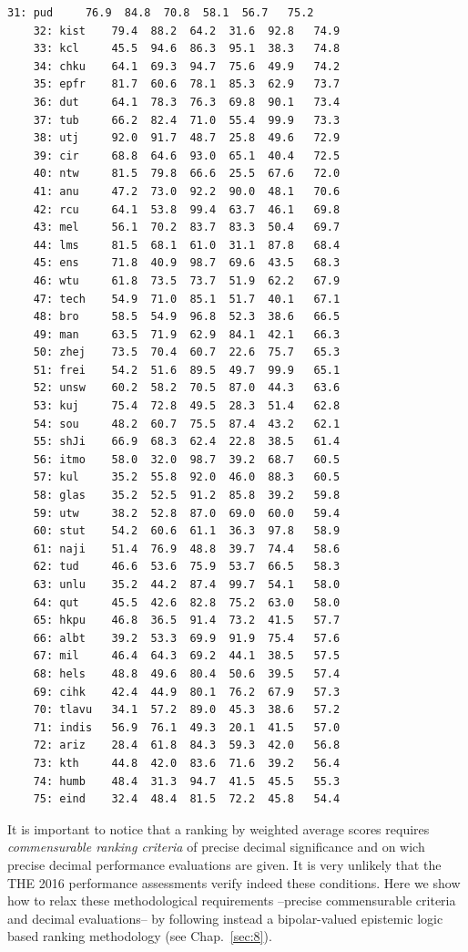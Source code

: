 \begin{lstlisting}[caption={Printing the ranked performance table},label=list:13.5,basicstyle=\ttfamily\scriptsize]
    31: pud 	76.9  84.8  70.8  58.1  56.7   75.2
    32: kist 	79.4  88.2  64.2  31.6  92.8   74.9
    33: kcl 	45.5  94.6  86.3  95.1  38.3   74.8
    34: chku 	64.1  69.3  94.7  75.6  49.9   74.2
    35: epfr 	81.7  60.6  78.1  85.3  62.9   73.7
    36: dut 	64.1  78.3  76.3  69.8  90.1   73.4
    37: tub 	66.2  82.4  71.0  55.4  99.9   73.3
    38: utj 	92.0  91.7  48.7  25.8  49.6   72.9
    39: cir 	68.8  64.6  93.0  65.1  40.4   72.5
    40: ntw 	81.5  79.8  66.6  25.5  67.6   72.0
    41: anu 	47.2  73.0  92.2  90.0  48.1   70.6
    42: rcu 	64.1  53.8  99.4  63.7  46.1   69.8
    43: mel 	56.1  70.2  83.7  83.3  50.4   69.7
    44: lms 	81.5  68.1  61.0  31.1  87.8   68.4
    45: ens 	71.8  40.9  98.7  69.6  43.5   68.3
    46: wtu 	61.8  73.5  73.7  51.9  62.2   67.9
    47: tech 	54.9  71.0  85.1  51.7  40.1   67.1
    48: bro 	58.5  54.9  96.8  52.3  38.6   66.5
    49: man 	63.5  71.9  62.9  84.1  42.1   66.3
    50: zhej 	73.5  70.4  60.7  22.6  75.7   65.3
    51: frei 	54.2  51.6  89.5  49.7  99.9   65.1
    52: unsw 	60.2  58.2  70.5  87.0  44.3   63.6
    53: kuj 	75.4  72.8  49.5  28.3  51.4   62.8
    54: sou 	48.2  60.7  75.5  87.4  43.2   62.1
    55: shJi 	66.9  68.3  62.4  22.8  38.5   61.4
    56: itmo 	58.0  32.0  98.7  39.2  68.7   60.5
    57: kul 	35.2  55.8  92.0  46.0  88.3   60.5
    58: glas 	35.2  52.5  91.2  85.8  39.2   59.8
    59: utw 	38.2  52.8  87.0  69.0  60.0   59.4
    60: stut 	54.2  60.6  61.1  36.3  97.8   58.9
    61: naji 	51.4  76.9  48.8  39.7  74.4   58.6
    62: tud 	46.6  53.6  75.9  53.7  66.5   58.3
    63: unlu 	35.2  44.2  87.4  99.7  54.1   58.0
    64: qut 	45.5  42.6  82.8  75.2  63.0   58.0
    65: hkpu 	46.8  36.5  91.4  73.2  41.5   57.7
    66: albt 	39.2  53.3  69.9  91.9  75.4   57.6
    67: mil 	46.4  64.3  69.2  44.1  38.5   57.5
    68: hels 	48.8  49.6  80.4  50.6  39.5   57.4
    69: cihk 	42.4  44.9  80.1  76.2  67.9   57.3
    70: tlavu 	34.1  57.2  89.0  45.3  38.6   57.2
    71: indis 	56.9  76.1  49.3  20.1  41.5   57.0
    72: ariz 	28.4  61.8  84.3  59.3  42.0   56.8
    73: kth 	44.8  42.0  83.6  71.6  39.2   56.4
    74: humb 	48.4  31.3  94.7  41.5  45.5   55.3
    75: eind 	32.4  48.4  81.5  72.2  45.8   54.4
\end{lstlisting}

It is important to notice that a ranking by weighted average scores requires \emph{commensurable ranking criteria} of precise decimal significance and on wich precise decimal performance evaluations are given. It is very unlikely that the THE 2016 performance assessments verify indeed these conditions. Here we show how to relax these methodological requirements --precise commensurable criteria and decimal evaluations-- by following instead a bipolar-valued epistemic logic based ranking methodology (see Chap.~\ref{sec:8}).

